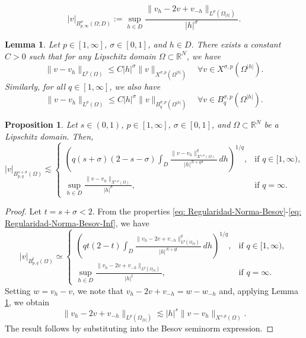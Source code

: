 \documentclass[10pt,a4paper]{amsart}
\newtheorem{Lemma}{Lemma}
\newtheorem{proposition}{Proposition}
\begin{document}
	\begin{equation}
	\label{eq: Regularidad-Norma-Besov-Inf}
	|v|_{B_{p, \infty}^{\sigma}(\Omega; D)} := \sup_{h \in D} \frac{\| v_h - 2v + v_{-h}\|_{L^p(\Omega_{|h|})}}{|h|^\sigma}.\end{equation}

	\begin{Lemma} 
	\label{Regularidad: Lemma estimativa de error}
		Let \( p \in [1, \infty] \), \( \sigma \in [0,1] \), and \( h \in D \). There exists a constant \( C > 0 \) such that for any Lipschitz domain \( \Omega \subset \mathbb{R}^N \), we have
		\[
		\|v - v_h\|_{L^p(\Omega)} \leq C |h|^\sigma \|v\|_{X^{\sigma, p}(\Omega^{|h|})} \quad \forall v \in X^{\sigma, p}(\Omega^{|h|}).
		\]
        Similarly, for all $q \in [1,\infty]$, we also have
        \begin{equation} \label{eq:traslacion_Besov}
            \|v - v_h\|_{L^p(\Omega)} \leq C |h|^\sigma \|v\|_{B^{\sigma, p}_q(\Omega^{|h|})} \quad \forall v \in B^{\sigma, p}_q(\Omega^{|h|}).
        \end{equation}
	\end{Lemma}

	\begin{proposition}
		\label{Resularidad: Reiteración Besov}
		Let \( s \in (0,1) \), \( p \in [1, \infty] \), \( \sigma \in [0,1] \), and \( \Omega \subset \mathbb{R}^N \) be a Lipschitz domain. Then,
		\[
		|v|_{B_{p,q}^{s+\sigma}(\Omega)} \lesssim 
		\begin{cases}
			\left(q(s+\sigma)(2-s-\sigma) \displaystyle\int_{D} \frac{\|v - v_h\|_{X^{s,p}(\Omega)}^q}{|h|^{N+q\sigma}} \, dh\right)^{1/q}, & \text{if } q \in [1, \infty), \\[1em]
			\displaystyle \sup_{h \in D} \frac{\|v - v_h\|_{X^{s,p}(\Omega)}}{|h|^\sigma}, & \text{if } q = \infty.
		\end{cases}
		\]
	\end{proposition}

	\begin{proof}
		Let \( t = s + \sigma < 2 \). From the properties \eqref{eq: Regularidad-Norma-Besov}-\eqref{eq: Regularidad-Norma-Besov-Inf}, we have
		\[
		|v|_{B_{p,q}^t(\Omega)} \simeq 
		\begin{cases}
			\left(q t(2 - t) \displaystyle \int_{D} \frac{\|v_h - 2v + v_{-h}\|_{L^p(\Omega_{|h|})}^q}{|h|^{N + q t}} \, dh\right)^{1/q}, & \text{if } q \in [1, \infty), \\[1em]
			\displaystyle \sup_{h \in D} \frac{\|v_h - 2v + v_{-h}\|_{L^p(\Omega_{|h|})}}{|h|^t}, & \text{if } q = \infty.
		\end{cases}
		\]
		Setting \( w = v_h - v \), we note that
        $v_h - 2v + v_{-h} = w - w_{-h}$ and,
		applying Lemma \ref{Regularidad: Lemma estimativa de error}, we obtain
		\[
		\|v_h - 2v + v_{-h}\|_{L^p(\Omega_{|h|})} \lesssim |h|^s \|v - v_h\|_{X^{s,p}(\Omega)}.
		\]
		The result follows by substituting into the Besov seminorm expression.
	\end{proof}
\end{document}
